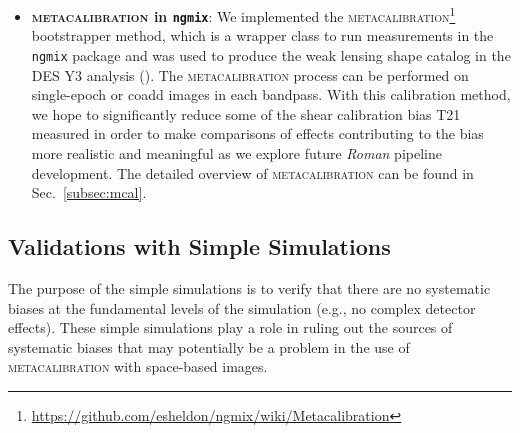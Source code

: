 \documentclass[fleqn,usenatbib]{mnras}
\begin{document}
\begin{itemize}
    \item \textbf{\textsc{metacalibration} in \texttt{ngmix}}: We implemented the \textsc{metacalibration}\footnote{\url{https://github.com/esheldon/ngmix/wiki/Metacalibration}} bootstrapper method, which is a wrapper class to run measurements in the \texttt{ngmix} package and was used to produce the weak lensing shape catalog in the DES Y3 analysis (\citealt{2020arXiv201103408G}). The \textsc{metacalibration} process can be performed on single-epoch or coadd images in each bandpass. With this calibration method, we hope to significantly reduce some of the shear calibration bias T21 measured in order to make comparisons of effects contributing to the bias more realistic and meaningful as we explore future \emph{Roman} pipeline development. The detailed overview of \textsc{metacalibration} can be found in Sec.~\ref{subsec:mcal}. 
\end{itemize}


\subsection{Validations with Simple Simulations}
\label{subsec:simplesim}
The purpose of the simple simulations is to verify that there are no systematic biases at the fundamental levels of the simulation (e.g., no complex detector effects). These simple simulations play a role in ruling out the sources of systematic biases that may potentially be a problem in the use of \textsc{metacalibration} with space-based images. 
\end{document}
